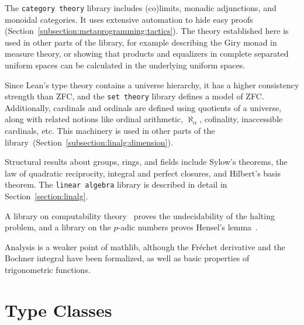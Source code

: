 \documentclass[sigplan]{acmart}\settopmatter{}
\newcommand{\mathlib}{\textsf{mathlib}\xspace}
\begin{document}
The \texttt{category theory} library includes (co)limits, monadic adjunctions, and monoidal categories.
It uses extensive automation to hide easy proofs (Section~\ref{subsection:metaprogramming:tactics}).
The theory established here is used in other parts of the library,
for example describing the Giry monad in measure theory,
or showing that products and equalizers in complete separated uniform spaces can be calculated in the underlying uniform spaces.

Since Lean's type theory contains a universe hierarchy, it has a higher consistency strength than ZFC, and the \texttt{set theory} library defines a model of ZFC. Additionally, cardinals and ordinals are defined using quotients of a universe, along with related notions like ordinal arithmetic, $\aleph_\alpha$, cofinality, inaccessible cardinals, etc. This machinery is used in other parts of the library~(Section~\ref{subsection:linalg:dimension}).

Structural results about groups, rings, and fields include Sylow's theorems, the law of quadratic reciprocity, integral and perfect closures, and Hilbert's basis theorem. The \texttt{linear algebra} library is described in detail in Section~\ref{section:linalg}.

A library on computability theory~\cite{Carn19} proves the undecidability of the halting problem,
and a library on the $p$-adic numbers proves Hensel’s lemma~\cite{Lewi19}.

Analysis is a weaker point of \mathlib, although the Fr\'echet derivative and the Bochner integral have been formalized, as well as basic properties of trigonometric functions.


\section{Type Classes}
\label{section:typeclasses}
\end{document}
